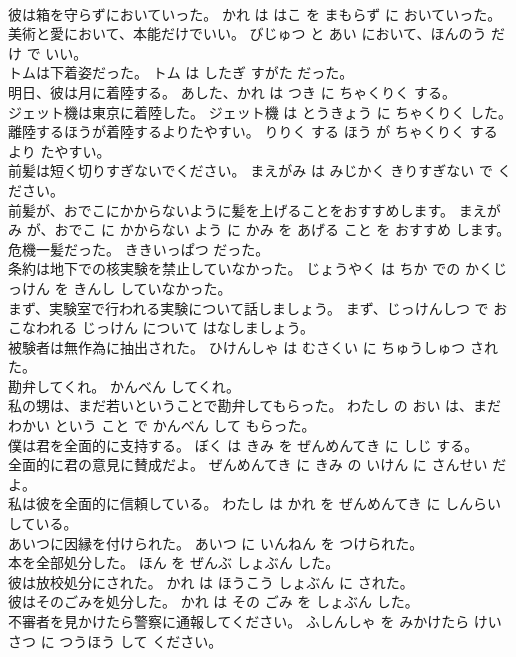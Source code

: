 \documentclass[8pt]{extreport}
\begin{document}
\begin{CJK}{UTF8}{min}
\\	彼は箱を守らずにおいていった。	かれ は はこ を まもらず に おいていった。	
\\	美術と愛において、本能だけでいい。	びじゅつ と あい において、ほんのう だけ で いい。	
\\	トムは下着姿だった。	トム は したぎ すがた だった。	
\\	明日、彼は月に着陸する。	あした、かれ は つき に ちゃくりく する。	
\\	ジェット機は東京に着陸した。	ジェット機 は とうきょう に ちゃくりく した。	
\\	離陸するほうが着陸するよりたやすい。	りりく する ほう が ちゃくりく する より たやすい。	
\\	前髪は短く切りすぎないでください。	まえがみ は みじかく きりすぎない で ください。	
\\	前髪が、おでこにかからないように髪を上げることをおすすめします。	まえがみ が、おでこ に かからない よう に かみ を あげる こと を おすすめ します。	
\\	危機一髪だった。	ききいっぱつ だった。	
\\	条約は地下での核実験を禁止していなかった。	じょうやく は ちか での かくじっけん を きんし していなかった。	
\\	まず、実験室で行われる実験について話しましょう。	まず、じっけんしつ で おこなわれる じっけん について はなしましょう。	
\\	被験者は無作為に抽出された。	ひけんしゃ は むさくい に ちゅうしゅつ された。	
\\	勘弁してくれ。	かんべん してくれ。	
\\	私の甥は、まだ若いということで勘弁してもらった。	わたし の おい は、まだ わかい という こと で かんべん して もらった。	
\\	僕は君を全面的に支持する。	ぼく は きみ を ぜんめんてき に しじ する。	
\\	全面的に君の意見に賛成だよ。	ぜんめんてき に きみ の いけん に さんせい だよ。	
\\	私は彼を全面的に信頼している。	わたし は かれ を ぜんめんてき に しんらい している。	
\\	あいつに因縁を付けられた。	あいつ に いんねん を つけられた。	
\\	本を全部処分した。	ほん を ぜんぶ しょぶん した。	
\\	彼は放校処分にされた。	かれ は ほうこう しょぶん に された。	
\\	彼はそのごみを処分した。	かれ は その ごみ を しょぶん した。	
\\	不審者を見かけたら警察に通報してください。	ふしんしゃ を みかけたら けいさつ に つうほう して ください。	

\end{CJK}
\end{document}
